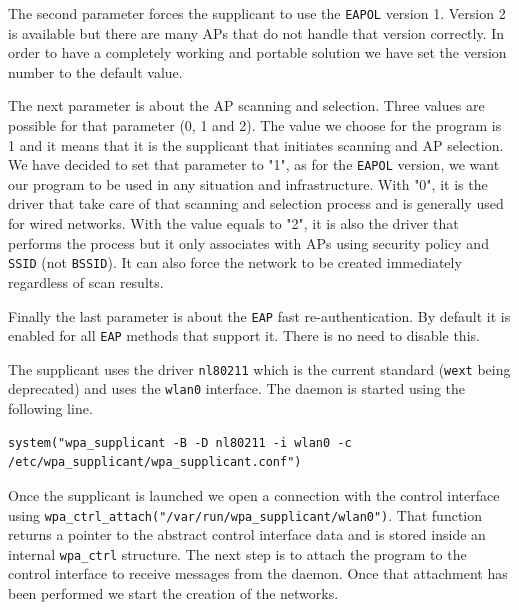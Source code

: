 The second parameter forces the supplicant to use the \texttt{EAPOL} version 1. Version 2 is available but there are many APs that do not handle that version correctly. In order to have a completely working and portable solution we have set the version number to the default value.

The next parameter is about the AP scanning and selection. Three values are possible for that parameter (0, 1 and 2). The value we choose for the program is 1 and it means that it is the supplicant that initiates scanning and AP selection. We have decided to set that parameter to "1", as for the \texttt{EAPOL} version, we want our program to be used in any situation and infrastructure. With "0", it is the driver that take care of that scanning and selection process and is generally used for wired networks. With the value equals to "2", it is also the driver that performs the process but it only associates with APs using security policy and \texttt{SSID} (not \texttt{BSSID}). It can also force the network to be created immediately regardless of scan results.

Finally the last parameter is about the \texttt{EAP} fast re-authentication. By default it is enabled for all \texttt{EAP} methods that support it. There is no need to disable this.


The supplicant uses the driver \texttt{nl80211} which is the current standard (\texttt{wext} being deprecated) and uses the \texttt{wlan0} interface. The daemon is started using the following line.\\

\begin{lstlisting}[frame=single,breaklines=true,caption={Starting the \texttt{wpa\_supplicant} daemon}]
system("wpa_supplicant -B -D nl80211 -i wlan0 -c /etc/wpa_supplicant/wpa_supplicant.conf")
\end{lstlisting}

Once the supplicant is launched we open a connection with the control interface using \texttt{wpa\_ctrl\_attach("/var/run/wpa\_supplicant/wlan0")}. That function returns a pointer to the abstract control interface data and is stored inside an internal \texttt{wpa\_ctrl} structure. The next step is to attach the program to the control interface to receive messages from the daemon. Once that attachment has been performed we start the creation of the networks.

